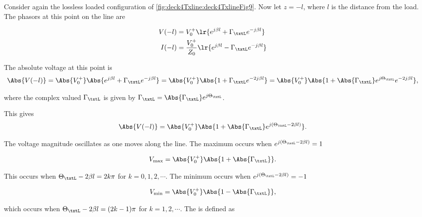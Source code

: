 Consider again the lossless loaded configuration of \cref{fig:deck4Txline:deck4TxlineFig9}.  Now let \( z = - l \), where \( l \) is the distance from the load.  The phasors at this point on the line are

\begin{equation}\label{eqn:uwaves4TransmissionLines:1100}
\begin{aligned}
V(-l) &= V_0^{+} \lr{ e^{j \beta l} + \Gamma_\txtL e^{-j \beta l} } \\
I(-l) &= \frac{V_0^{+}}{Z_0} \lr{ e^{j \beta l} - \Gamma_\txtL  e^{-j \beta l} } \\
\end{aligned}
\end{equation}

The absolute voltage at this point is
\begin{dmath}\label{eqn:uwaves4TransmissionLines:1120}
\Abs{V(-l)} 
= \Abs{V_0^{+}} \Abs{ e^{j \beta l} + \Gamma_\txtL e^{-j \beta l} }
= \Abs{V_0^{+}} \Abs{ 1 + \Gamma_\txtL e^{-2 j \beta l} }
= \Abs{V_0^{+}} \Abs{ 1 + \Abs{\Gamma_\txtL} e^{j \Theta_\txtL} e^{-2 j \beta l} },
\end{dmath}

where the complex valued \( \Gamma_\txtL \) is given by \( \Gamma_\txtL = \Abs{\Gamma_\txtL} e^{j \Theta_\txtL} \).

This gives
\begin{equation}\label{eqn:uwaves4TransmissionLines:1140}
\Abs{V(-l)} 
= \Abs{V_0^{+}} \Abs{ 1 + \Abs{\Gamma_\txtL} e^{j(\Theta_\txtL -2 \beta l)} }.
\end{equation}

The voltage magnitude oscillates as one moves along the line.  The maximum occurs when \( e^{j (\Theta_\txtL -2 \beta l)}  = 1 \)

\begin{equation}\label{eqn:uwaves4TransmissionLines:1160}
V_{\mathrm{max}} = \Abs{V_0^{+}} \Abs{ 1 + \Abs{\Gamma_\txtL} }.
\end{equation}

This occurs when \( \Theta_\txtL - 2 \beta l = 2 k \pi \) for \( k = 0, 1, 2, \cdots \).  The minimum occurs when \( e^{j (\Theta_\txtL -2 \beta l)}  = -1 \)

\begin{equation}\label{eqn:uwaves4TransmissionLines:1180}
V_{\mathrm{min}} = \Abs{V_0^{+}} \Abs{ 1 - \Abs{\Gamma_\txtL} },
\end{equation}

which occurs when \( \Theta_\txtL - 2 \beta l = (2 k - 1 )\pi \) for \( k = 1, 2, \cdots \).  The  is defined as

